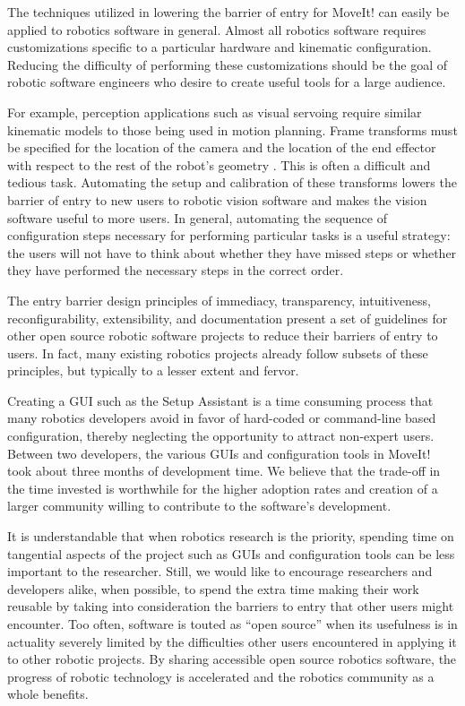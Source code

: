 \documentclass[10pt,journal,compsoc]{joser1}
\begin{document}
{The techniques utilized in lowering the barrier of entry for MoveIt! can easily
be applied to robotics software in general. Almost all robotics software
requires customizations specific to a particular hardware and kinematic
configuration. Reducing the difficulty of performing these customizations should
be the goal of robotic software engineers who desire to create useful tools for
a large audience. 

For example, perception applications such as visual servoing require similar
kinematic models to those being used in motion planning. Frame transforms must
be specified for the location of the camera and the location of the end effector
with respect to the rest of the robot's geometry \cite{visual_servoing}. This is
often a difficult and tedious task. Automating the setup and calibration of
these transforms lowers the barrier of entry to new users to robotic vision
software and makes the vision software useful to more users. In general,
automating the sequence of configuration steps necessary for performing
particular tasks is a useful strategy: the users will not have to think about
whether they have missed steps or whether they have performed the necessary
steps in the correct order. 

The entry barrier design principles of immediacy, transparency, intuitiveness,
reconfigurability, extensibility, and documentation present a set of guidelines
for other open source robotic software projects to reduce their barriers of
entry to users. In fact, many existing robotics projects already follow subsets
of these principles, but typically to a lesser extent and fervor.

Creating a GUI such as the Setup Assistant is a time consuming process that many
robotics developers avoid in favor of hard-coded or command-line based
configuration, thereby neglecting the opportunity to attract non-expert users.
Between two developers, the various GUIs and configuration tools in MoveIt! took
about three months of development time. We believe that the trade-off in the
time invested is worthwhile for the higher adoption rates and creation of a
larger community willing to contribute to the software's development. 

It is understandable that when robotics research is the priority, spending time
on tangential aspects of the project such as GUIs and configuration tools can be
less important to the researcher. Still, we would like to encourage researchers
and developers alike, when possible, to spend the extra time making their work
reusable by taking into consideration the barriers to entry that other users
might encounter. Too often, software is touted as ``open source'' when its
usefulness is in actuality severely limited by the difficulties other users
encountered in applying it to other robotic projects. By sharing accessible open
source robotics software, the progress of robotic technology is accelerated and
the robotics community as a whole benefits.

}
\end{document}
